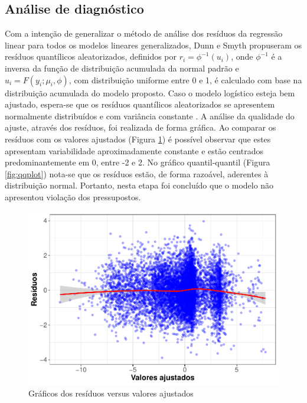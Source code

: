 \documentclass[twocolumn]{rbef}
\newcommand{\1}{\mathbbm{1}}
\begin{document}
\hypertarget{anuxe1lise-de-diagnuxf3stico}{%
\subsection{Análise de diagnóstico}\label{anuxe1lise-de-diagnuxf3stico}}

Com a intenção de generalizar o método de análise dos resíduos da regressão linear para todos os modelos lineares generalizados, Dunn e Smyth \cite{Dunn1996} propuseram os resíduos quantílicos aleatorizados, definidos por \(r_i = \phi^{-1}(u_i)\), onde \(\phi^{-1}\) é a inversa da função de distribuição acumulada da normal padrão e \(u_i = F(y_i;\mu_i,\phi)\), com distribuição uniforme entre 0 e 1, é calculado com base na distribuição acumulada do modelo proposto. Caso o modelo logístico esteja bem ajustado, espera-se que os resíduos quantílicos aleatorizados se apresentem normalmente distribuídos e com variância constante \cite{Taconeli2015}. A análise da qualidade do ajuste, através dos resíduos, foi realizada de forma gráfica. Ao comparar os resíduos com os valores ajustados (Figura \ref{fig:resplot}) é possível observar que estes apresentam variabilidade aproximadamente constante e estão centrados predominantemente em 0, entre -2 e 2. No gráfico quantil-quantil \cite{Wilk1968} (Figura \ref{fig:qqplot}) nota-se que os resíduos estão, de forma razoável, aderentes à distribuição normal. Portanto, nesta etapa foi concluído que o modelo não apresentou violação dos pressupostos.

\begin{figure}

{\centering \includegraphics[width=1\linewidth]{article_files/figure-latex/resplot-1} 

}

\caption{Gráficos dos resíduos versus valores ajustados}\label{fig:resplot}
\end{figure}
\end{document}
